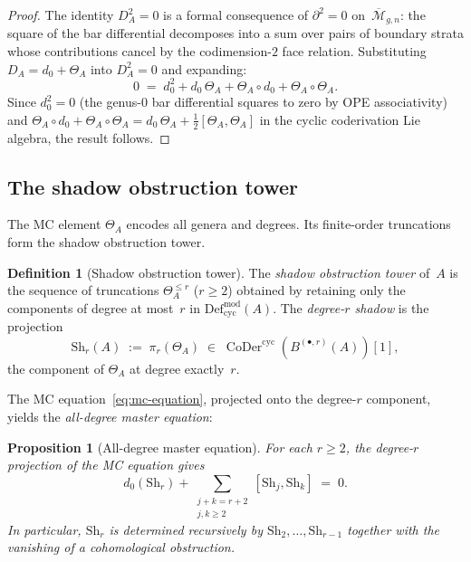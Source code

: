 \documentclass[11pt]{article}
\theoremstyle{plain}
\newtheorem{proposition}[theorem]{Proposition}
\theoremstyle{definition}
\newtheorem{definition}[theorem]{Definition}
\theoremstyle{remark}
\newcommand{\Defcyc}{\mathrm{Def}_{\mathrm{cyc}}}
\newcommand{\Mbar}{\overline{\mathcal{M}}}
\newcommand{\Sh}{\mathrm{Sh}}
\begin{document}
\begin{proof}
The identity $D_A^2 = 0$ is a formal consequence of
$\partial^2 = 0$ on~$\Mbar_{g,n}$: the square of the bar
differential decomposes into a sum over pairs of boundary
strata whose contributions cancel by the codimension-$2$
face relation. Substituting $D_A = d_0 + \Theta_A$ into
$D_A^2 = 0$ and expanding:
\[
 0 \;=\; d_0^2 + d_0\,\Theta_A + \Theta_A \circ d_0
 + \Theta_A \circ \Theta_A.
\]
Since $d_0^2 = 0$ (the genus-$0$ bar differential squares to
zero by OPE associativity) and
$\Theta_A \circ d_0 + \Theta_A \circ \Theta_A
= d_0\,\Theta_A + \tfrac{1}{2}[\Theta_A, \Theta_A]$
in the cyclic coderivation Lie algebra, the result follows.
\end{proof}


\subsection{The shadow obstruction tower}

The MC element $\Theta_A$ encodes all genera and degrees.
Its finite-order truncations form the shadow obstruction tower.

\begin{definition}[Shadow obstruction tower]
\label{def:shadow-tower}
The \emph{shadow obstruction tower} of~$A$ is the sequence of truncations
$\Theta_A^{\leq r}$ ($r \geq 2$) obtained by retaining only
the components of degree at most~$r$ in $\Defcyc^{\mathrm{mod}}(A)$.
The \emph{degree-$r$ shadow} is the projection
\[
 \Sh_r(A) \;:=\;
 \pi_r(\Theta_A)
 \;\in\;
 \operatorname{CoDer}^{\mathrm{cyc}}(B^{(\bullet,r)}(A))[1],
\]
the component of $\Theta_A$ at degree exactly~$r$.
\end{definition}

The MC equation~\eqref{eq:mc-equation}, projected onto
the degree-$r$ component, yields the \emph{all-degree master
equation}:

\begin{proposition}[All-degree master equation]
\label{prop:master-eq}
For each $r \geq 2$, the degree-$r$ projection of the MC
equation gives
\begin{equation}\label{eq:master-eq}
 d_0(\Sh_r) + \sum_{\substack{j+k = r+2 \\ j,k \geq 2}}
 [\Sh_j, \Sh_k] \;=\; 0.
\end{equation}
In particular, $\Sh_r$ is determined recursively by
$\Sh_2, \ldots, \Sh_{r-1}$ together with the
vanishing of a cohomological obstruction.
\end{proposition}
\end{document}
